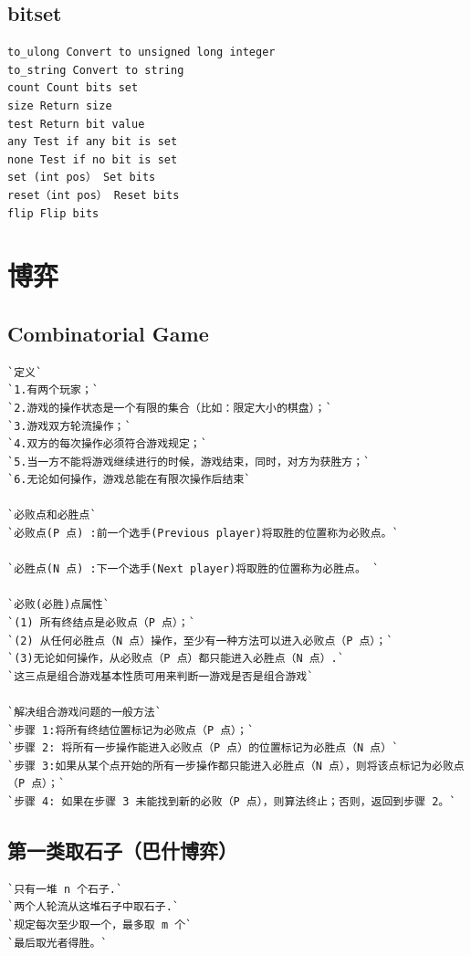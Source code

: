 \documentclass[a4paper]{article}
\begin{document}
\begin{CJK*}{UTF8}{gbsn}
\begin{multicols}{3}
\begin{flushleft}
\subsection{bitset}
\begin{lstlisting}
to_ulong Convert to unsigned long integer
to_string Convert to string
count Count bits set
size Return size
test Return bit value
any Test if any bit is set
none Test if no bit is set
set (int pos） Set bits
reset（int pos） Reset bits
flip Flip bits
\end{lstlisting}

\section{博弈}

\subsection{Combinatorial Game}
\begin{lstlisting}
`定义`
`1.有两个玩家；`
`2.游戏的操作状态是一个有限的集合（比如：限定大小的棋盘）；`
`3.游戏双方轮流操作；`
`4.双方的每次操作必须符合游戏规定；`
`5.当一方不能将游戏继续进行的时候，游戏结束，同时，对方为获胜方；`
`6.无论如何操作，游戏总能在有限次操作后结束`

`必败点和必胜点`
`必败点(P 点) :前一个选手(Previous player)将取胜的位置称为必败点。`

`必胜点(N 点) :下一个选手(Next player)将取胜的位置称为必胜点。 `

`必败(必胜)点属性`
`(1) 所有终结点是必败点（P 点）；`
`(2) 从任何必胜点（N 点）操作，至少有一种方法可以进入必败点（P 点）；`
`(3)无论如何操作，从必败点（P 点）都只能进入必胜点（N 点）.`
`这三点是组合游戏基本性质可用来判断一游戏是否是组合游戏`

`解决组合游戏问题的一般方法`
`步骤 1:将所有终结位置标记为必败点（P 点）；`
`步骤 2: 将所有一步操作能进入必败点（P 点）的位置标记为必胜点（N 点）`
`步骤 3:如果从某个点开始的所有一步操作都只能进入必胜点（N 点），则将该点标记为必败点（P 点）；`
`步骤 4: 如果在步骤 3 未能找到新的必败（P 点），则算法终止；否则，返回到步骤 2。`

\end{lstlisting}

\subsection{第一类取石子（巴什博弈）}
\begin{lstlisting}
`只有一堆 n 个石子.`
`两个人轮流从这堆石子中取石子.`
`规定每次至少取一个，最多取 m 个`
`最后取光者得胜。`


\end{lstlisting}
\end{flushleft}
\end{multicols}
\end{CJK*}
\end{document}

